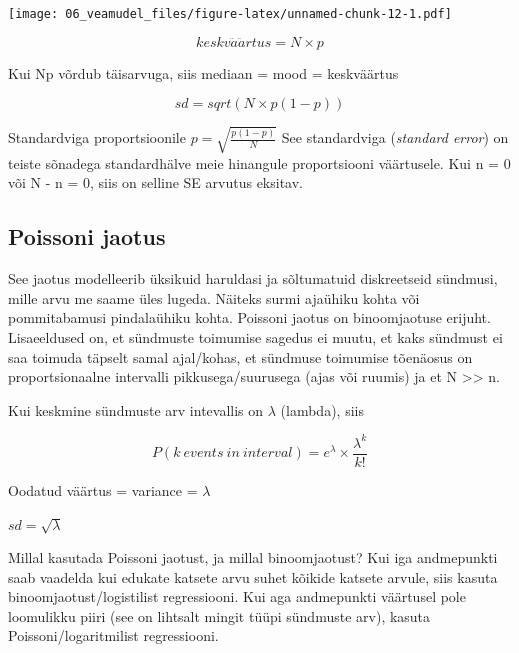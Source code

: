 \documentclass[]{book}
\newenvironment{Shaded}{\begin{snugshade}}{\end{snugshade}}
\newcommand{\KeywordTok}[1]{\textcolor[rgb]{0.13,0.29,0.53}{\textbf{#1}}}
\newcommand{\DecValTok}[1]{\textcolor[rgb]{0.00,0.00,0.81}{#1}}
\newcommand{\FloatTok}[1]{\textcolor[rgb]{0.00,0.00,0.81}{#1}}
\newcommand{\StringTok}[1]{\textcolor[rgb]{0.31,0.60,0.02}{#1}}
\newcommand{\CommentTok}[1]{\textcolor[rgb]{0.56,0.35,0.01}{\textit{#1}}}
\newcommand{\NormalTok}[1]{#1}
\begin{document}
\begin{Shaded}
\end{Shaded}

\texttt{[image: 06\_veamudel\_files/figure-latex/unnamed-chunk-12-1.pdf]}

\[keskv\ddot{a}\ddot{a}rtus = N \times p\]

Kui Np võrdub täisarvuga, siis mediaan = mood = keskväärtus

\[sd = sqrt(N \times p(1 - p))\]

Standardviga proportsioonile \(p = \sqrt{\frac{p(1 - p)}{N}}\) See
standardviga (\emph{standard error}) on teiste sõnadega standardhälve
meie hinangule proportsiooni väärtusele. Kui n = 0 või N - n = 0, siis
on selline SE arvutus eksitav.

\subsection{Poissoni jaotus}\label{poissoni-jaotus}

See jaotus modelleerib üksikuid haruldasi ja sõltumatuid diskreetseid
sündmusi, mille arvu me saame üles lugeda. Näiteks surmi ajaühiku kohta
või pommitabamusi pindalaühiku kohta. Poissoni jaotus on binoomjaotuse
erijuht. Lisaeeldused on, et sündmuste toimumise sagedus ei muutu, et
kaks sündmust ei saa toimuda täpselt samal ajal/kohas, et sündmuse
toimumise tõenäosus on proportsionaalne intervalli pikkusega/suurusega
(ajas või ruumis) ja et N \textgreater{}\textgreater{} n.

Kui keskmine sündmuste arv intevallis on \(\lambda\) (lambda), siis

\[P(k~events~in~interval) = e^{\lambda} \times \frac{\lambda ^{k}}{k!}\]

Oodatud väärtus = variance = \(\lambda\)

\(sd = \sqrt{\lambda}\)

Millal kasutada Poissoni jaotust, ja millal binoomjaotust? Kui iga
andmepunkti saab vaadelda kui edukate katsete arvu suhet kõikide katsete
arvule, siis kasuta binoomjaotust/logistilist regressiooni. Kui aga
andmepunkti väärtusel pole loomulikku piiri (see on lihtsalt mingit
tüüpi sündmuste arv), kasuta Poissoni/logaritmilist regressiooni.
\end{document}
